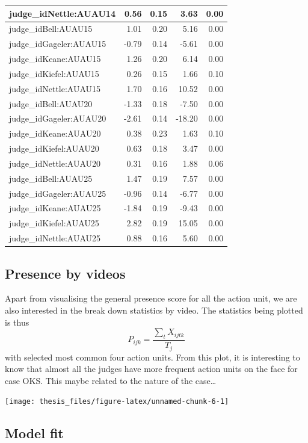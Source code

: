 \documentclass{monashthesis}
\begin{document}
\begin{tabular}{l|r|r|r|r}
\hline
judge\_idNettle:AUAU14 & 0.56 & 0.15 & 3.63 & 0.00\\
\hline
judge\_idBell:AUAU15 & 1.01 & 0.20 & 5.16 & 0.00\\
\hline
judge\_idGageler:AUAU15 & -0.79 & 0.14 & -5.61 & 0.00\\
\hline
judge\_idKeane:AUAU15 & 1.26 & 0.20 & 6.14 & 0.00\\
\hline
judge\_idKiefel:AUAU15 & 0.26 & 0.15 & 1.66 & 0.10\\
\hline
judge\_idNettle:AUAU15 & 1.70 & 0.16 & 10.52 & 0.00\\
\hline
judge\_idBell:AUAU20 & -1.33 & 0.18 & -7.50 & 0.00\\
\hline
judge\_idGageler:AUAU20 & -2.61 & 0.14 & -18.20 & 0.00\\
\hline
judge\_idKeane:AUAU20 & 0.38 & 0.23 & 1.63 & 0.10\\
\hline
judge\_idKiefel:AUAU20 & 0.63 & 0.18 & 3.47 & 0.00\\
\hline
judge\_idNettle:AUAU20 & 0.31 & 0.16 & 1.88 & 0.06\\
\hline
judge\_idBell:AUAU25 & 1.47 & 0.19 & 7.57 & 0.00\\
\hline
judge\_idGageler:AUAU25 & -0.96 & 0.14 & -6.77 & 0.00\\
\hline
judge\_idKeane:AUAU25 & -1.84 & 0.19 & -9.43 & 0.00\\
\hline
judge\_idKiefel:AUAU25 & 2.82 & 0.19 & 15.05 & 0.00\\
\hline
judge\_idNettle:AUAU25 & 0.88 & 0.16 & 5.60 & 0.00\\
\hline
\end{tabular}

\hypertarget{presence-by-videos}{%
\subsection{Presence by videos}\label{presence-by-videos}}

Apart from visualising the general presence score for all the action unit, we are also interested in the break down statistics by video. The statistics being plotted is thus \[P_{ijk} = \frac{\sum_{t}X_{ijtk}}{T_j}\] with selected most common four action units. From this plot, it is interesting to know that almost all the judges have more frequent action units on the face for case OKS. This maybe related to the nature of the case\ldots{}

\texttt{[image: thesis\_files/figure-latex/unnamed-chunk-6-1]}

\hypertarget{model-fit-1}{%
\subsection{Model fit}\label{model-fit-1}}
\end{document}
